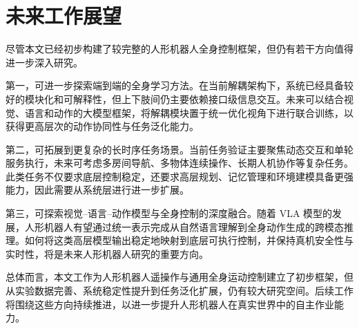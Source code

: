 \section{未来工作展望}

尽管本文已经初步构建了较完整的人形机器人全身控制框架，但仍有若干方向值得进一步深入研究。

第一，可进一步探索端到端的全身学习方法。在当前解耦架构下，系统已经具备较好的模块化和可解释性，但上下肢间仍主要依赖接口级信息交互。未来可以结合视觉、语言和动作的大模型框架，将解耦模块置于统一优化视角下进行联合训练，以获得更高层次的动作协同性与任务泛化能力。

第二，可拓展到更复杂的长时序任务场景。当前任务验证主要聚焦动态交互和单轮服务执行，未来可考虑多房间导航、多物体连续操作、长期人机协作等复杂任务。此类任务不仅要求底层控制稳定，还要求高层规划、记忆管理和环境建模具备更强能力，因此需要从系统层进行进一步扩展。

第三，可探索视觉--语言--动作模型与全身控制的深度融合。随着 VLA 模型的发展，人形机器人有望通过统一表示完成从自然语言理解到全身动作生成的跨模态推理。如何将这类高层模型输出稳定地映射到底层可执行控制，并保持真机安全性与实时性，将是未来人形机器人研究的重要方向。

总体而言，本文工作为人形机器人遥操作与通用全身运动控制建立了初步框架，但从实验数据完善、系统稳定性提升到任务泛化扩展，仍有较大研究空间。后续工作将围绕这些方向持续推进，以进一步提升人形机器人在真实世界中的自主作业能力。
